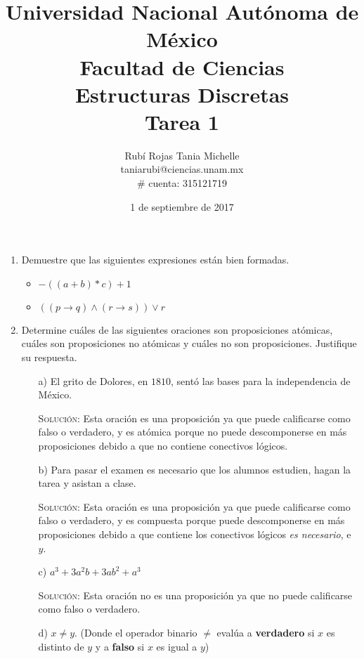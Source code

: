 \documentclass[letterpaper,11pt]{article}
\title{Universidad Nacional Autónoma de México \\
       Facultad de Ciencias \\
       Estructuras Discretas \\ 
       Tarea 1}
\author{Rubí Rojas Tania Michelle \\
        taniarubi@ciencias.unam.mx \\
        \# cuenta: 315121719}
\date{1 de septiembre de 2017}
\begin{document}
\maketitle

\begin{enumerate}
    \item Demuestre que las siguientes expresiones están bien formadas.    
    
    \begin{itemize}
        \item $- ((a + b) * c) + 1$
        \item $((p → q) \land (r → s)) \lor r$
    \end{itemize}

    \item Determine cuáles de las siguientes oraciones son proposiciones 
    atómicas, cuáles son proposiciones no atómicas y cuáles no son 
    proposiciones. Justifique su respuesta. 

    \begin{itemize}
        \item[a)] El grito de Dolores, en $1810$, sentó las bases para la 
        independencia de México.

        \textsc{Solución:} Esta oración es una proposición ya que puede 
        calificarse como falso o verdadero, y es atómica porque no puede 
        descomponerse en más proposiciones debido a que no contiene conectivos 
        lógicos.

        \item[b)] Para pasar el examen es necesario que los alumnos estudien, 
        hagan la tarea y asistan a clase.

        \textsc{Solución:} Esta oración es una proposición ya que puede 
        calificarse como falso o verdadero, y es compuesta porque puede 
        descomponerse en más proposiciones debido a que contiene los conectivos
        lógicos \textit{es necesario}, e $y$.

        \item[c)] $a^{3} + 3a^{2}b + 3ab^{2} + a^{3}$

        \textsc{Solución:} Esta oración no es una proposición ya que no puede 
        calificarse como falso o verdadero.

        \item[d)] $x \neq y$. (Donde el operador binario $\neq$ evalúa a 
        \textbf{verdadero} si $x$ es distinto de $y$ y a \textbf{falso} si 
        $x$ es igual a $y$)


\end{itemize}
\end{enumerate}
\end{document}
